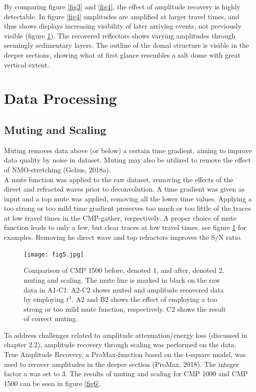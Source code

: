 \documentclass[10pt,a4paper]{article}
\begin{document}
\noindent By comparing figure \ref{fig3} and \ref{fig4}, the effect of amplitude recovery is highly detectable. In figure \ref{fig4} amplitudes are amplified at larger travel times, and thus shows displays increasing visibility of later arriving events, not previously visible (figure \ref{fig5}). The recovered reflectors shows varying amplitudes through seemingly sedimentary layers. The outline of the domal structure is visible in the deeper sections, showing what at first glance resembles a salt dome with great vertical extent.

\section{Data Processing}

\subsection{Muting and Scaling}

Muting removes data above (or below) a certain time gradient, aiming to improve data quality by noise in dataset. Muting may also be utilized to remove the effect of NMO-stretching (Gelius, 2018a). 
\\
A mute function was applied to the raw dataset, removing the effects of the direct and refracted waves prior to deconvolution. A time gradient was given as input and a top mute was applied, removing all the lower time values. Applying a too strong or too mild time gradient preserves too much or too little of the traces at low travel times in the CMP-gather, respectively. A proper choice of mute function leads to only a few, but clear traces at low travel times, see figure \ref{fig5} for examples. Removing he direct wave and top refractors improves the S/N ratio.


\begin{figure}[H]
\texttt{[image: fig5.jpg]}
\caption{Comparison of CMP 1500 before, denoted 1, and after, denoted 2, muting and scaling. The mute line is marked in black on the raw data in A1-C1. A2-C2 shows muted and amplitude recovered data by employing $t^3$. A2 and B2 shows the effect of employing a too strong or too mild mute function, respectively. C2 shows the result of correct muting.}
\label{fig5}
\end{figure}


\noindent To address challenges related to amplitude attenuation/energy loss (discussed in chapter 2.2), amplitude recovery through scaling was performed on the data. True Amplitude Recovery, a ProMax-function based on the t-square model, was used to recover amplitudes in the deeper section (ProMax, 2018). The integer factor a was set to 3. The results of muting and scaling for CMP 1000 and CMP 1500 can be seen in figure \ref{fig6}.  
\end{document}
